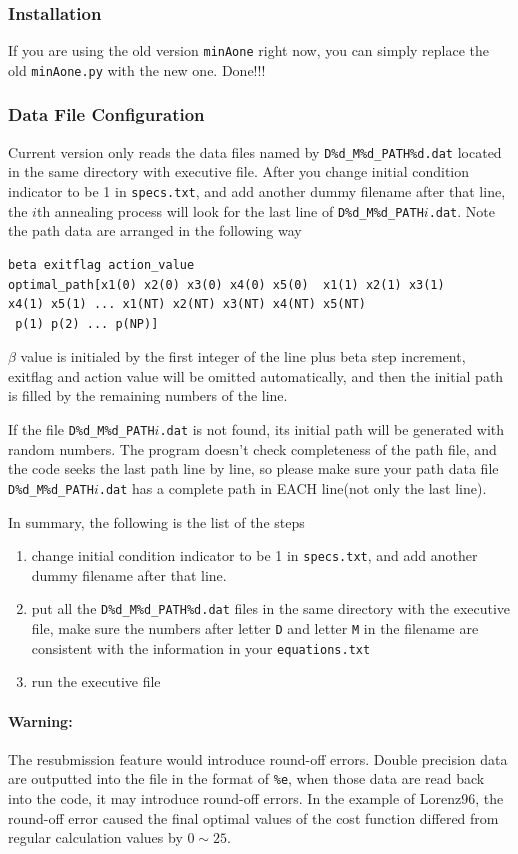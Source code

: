 \documentclass[11pt]{article}
\begin{document}
\subsubsection{Installation}
If you are using the old version \texttt{minAone} right now, you can simply replace the old \texttt{minAone.py} with the new one. Done!!!
\subsubsection{Data File Configuration}
Current version only reads the data files named by \texttt{D\%d\_M\%d\_PATH\%d.dat} located in the same directory with executive file. After you change initial condition indicator to be 1 in \texttt{specs.txt}, and add another dummy filename after that line, the $i$th annealing process will look for the last line of \texttt{D\%d\_M\%d\_PATH}$i$\texttt{.dat}. Note the path data are arranged in the following way
\begin{verbatim}
beta exitflag action_value 
optimal_path[x1(0) x2(0) x3(0) x4(0) x5(0)  x1(1) x2(1) x3(1) 
x4(1) x5(1) ... x1(NT) x2(NT) x3(NT) x4(NT) x5(NT)
 p(1) p(2) ... p(NP)]
\end{verbatim}
$\beta$ value is initialed by the first integer of the line plus beta step increment, exitflag and action value will be omitted automatically, and then the initial path is filled by the remaining numbers of the line.

If the file \texttt{D\%d\_M\%d\_PATH}$i$\texttt{.dat} is not found, its initial path will be generated with random numbers. The program doesn't check completeness of the path file, and the code seeks the last path line by line, so please make sure your path data file \texttt{D\%d\_M\%d\_PATH}$i$\texttt{.dat} has a complete path in EACH line(not only the last line).

In summary, the following is the list of the steps
\begin{enumerate}
\item change initial condition indicator to be 1 in \texttt{specs.txt}, and add another {\color{red}dummy} filename after that line. 
\item put all the \texttt{D\%d\_M\%d\_PATH\%d.dat} files in the same directory with the executive file, make sure the numbers after letter \texttt{D} and letter \texttt{M} in the filename are consistent with the information in your \texttt{equations.txt}
\item run the executive file
\end{enumerate}
\paragraph{Warning:} The resubmission feature would introduce round-off errors. Double precision data are outputted into the file in the format of \texttt{\%e}, when those data are read back into the code, it may introduce round-off errors. In the example of Lorenz96, the round-off error caused the final optimal values of the cost function differed from regular calculation values by $0\sim25$.
\end{document}
